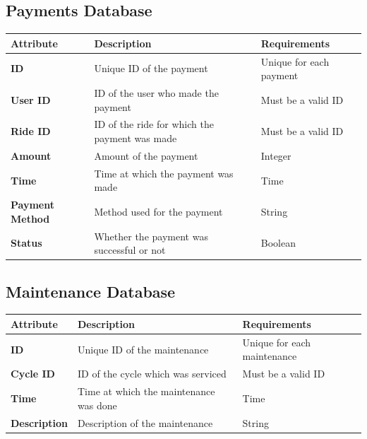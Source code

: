 \documentclass[11pt]{article}
\begin{document}
\begin{appendices}
\subsection{Payments Database}
\begin{center}
\begin{tabular}{|>{\centering\arraybackslash}m{}|>{\centering\arraybackslash}m{}|>{\centering\arraybackslash}m{}|}
    \hline
    \textbf{Attribute} & \textbf{Description} & \textbf{Requirements} \\
    \hline
    \textbf{ID} & Unique ID of the payment &  Unique for each payment\\
    \hline
    \textbf{User ID} & ID of the user who made the payment &  Must be a valid ID\\
    \hline
    \textbf{Ride ID} & ID of the ride for which the payment was made &  Must be a valid ID\\
    
    \textbf{Amount} & Amount of the payment &  Integer\\
    \hline
    \textbf{Time} & Time at which the payment was made &  Time\\
    \hline
    \textbf{Payment Method} & Method used for the payment &  String\\
    \hline
    \textbf{Status} & Whether the payment was successful or not &  Boolean\\
    \hline
\end{tabular}
\end{center}

\subsection{Maintenance Database}
\begin{center}
\begin{tabular}{|>{\centering\arraybackslash}m{}|>{\centering\arraybackslash}m{}|>{\centering\arraybackslash}m{}|}
    \hline
    \textbf{Attribute} & \textbf{Description} & \textbf{Requirements} \\
    \hline
    \textbf{ID} & Unique ID of the maintenance &  Unique for each maintenance\\
    \hline
    \textbf{Cycle ID} & ID of the cycle which was serviced &  Must be a valid ID\\
    \hline
    \textbf{Time} & Time at which the maintenance was done &  Time\\
    \hline
    \textbf{Description} & Description of the maintenance &  String\\
    \hline
\end{tabular}
\end{center}


\end{appendices}
\end{document}
